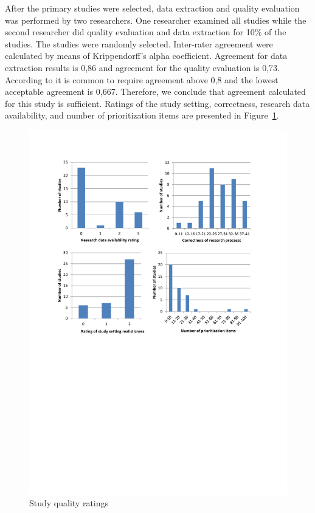 After the primary studies were selected, data extraction and quality evaluation was performed by two researchers.
One researcher examined all studies while the second researcher did quality evaluation and data extraction for 10\% of the studies. 
The studies were randomly selected.
Inter-rater agreement were calculated by means of Krippendorff's alpha coefficient.
Agreement for data extraction results is 0,86 and agreement for the quality evaluation is 0,73.
According to \citet{Krippendorff2004a} it is common to require agreement above 0,8 and the lowest acceptable agreement is 0,667. Therefore, we conclude that agreement calculated for this study is sufficient.
Ratings of the study setting, correctness, research data availability, and number of prioritization items are presented in Figure~\ref{fig:qeResults}.
%
\begin{figure}
\includegraphics[bb=60bp 360bp 560bp 790bp,clip,scale=0.75]{fig/qeResults}

\caption{\label{fig:qeResults}Study quality ratings}
%
\end{figure}

